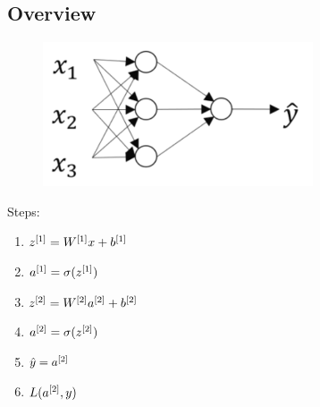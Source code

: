 
\subsection{Overview}
\begin{figure}[h]
\includegraphics[width=8cm]{images/twolayers.png}
\centering
\end{figure}
Steps: 
\begin{enumerate}
	\item $z^{[1]} = W^{[1]}x + b^{[1]}$
	\item $a^{[1]} = \sigma(z^{[1]})$
	\item $z^{[2]} = W^{[2]}a^{[2]} + b^{[2]}$
	\item $a^{[2]} = \sigma(z^{[2]})$
	\item $\hat{y} = a^{[2]}$
	\item $L(a^{[2]}, y)$ 
\end{enumerate}
